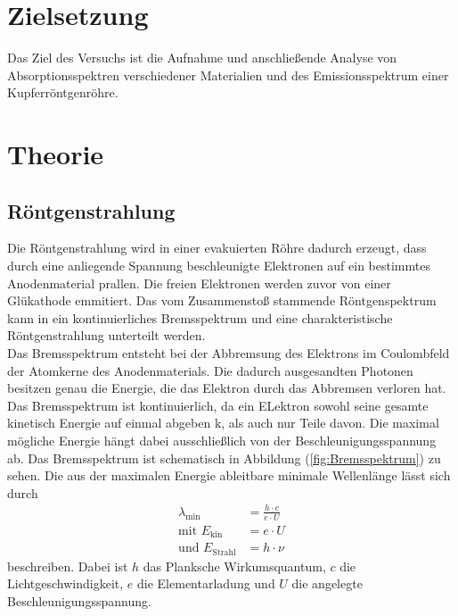 \section{Zielsetzung}
\label{sec:Zielsetzung}
Das Ziel des Versuchs ist die Aufnahme und anschließende Analyse von Absorptionsspektren verschiedener Materialien und des Emissionsspektrum einer 
Kupferröntgenröhre.
\section{Theorie}
\label{sec:Theorie}
\subsection{Röntgenstrahlung}
Die Röntgenstrahlung wird in einer evakuierten Röhre dadurch erzeugt, dass durch eine anliegende Spannung beschleunigte Elektronen auf ein bestimmtes Anodenmaterial prallen. Die freien Elektronen
werden zuvor von einer Glükathode emmitiert. Das vom Zusammenstoß stammende Röntgenspektrum kann in ein kontinuierliches Bremsspektrum und eine charakteristische 
Röntgenstrahlung unterteilt werden. \\
Das Bremsspektrum entsteht bei der Abbremsung des Elektrons im Coulombfeld der Atomkerne des Anodenmaterials. Die dadurch ausgesandten Photonen besitzen genau die 
Energie, die das Elektron durch das Abbremsen verloren hat. Das Bremsspektrum ist kontinuierlich, da ein ELektron sowohl seine gesamte kinetisch Energie auf einmal abgeben
k, als auch nur Teile davon. Die maximal mögliche Energie hängt dabei ausschließlich von der Beschleunigungsspannung ab. Das Bremsspektrum ist 
schematisch in Abbildung (\ref{fig:Bremsspektrum}) zu sehen. Die aus der maximalen Energie ableitbare minimale Wellenlänge lässt
sich durch 
\begin{align}
    \lambda_{\text{min}} &= \frac{h \cdot c}{e \cdot U} \label{eqn:lambda} \\
    \text{mit} \,\, E_{\text{kin}} &= e \cdot U \label{eqn:E_kin} \\
    \text{und} \,\, E_{\text{Strahl}} &= h \cdot \nu \label{eqn:E_Strahl}
\end{align}
beschreiben. Dabei ist $h$ das Planksche Wirkumsquantum, $c$ die Lichtgeschwindigkeit, $e$ die Elementarladung und $U$ die angelegte Beschleunigungsspannung.\\
